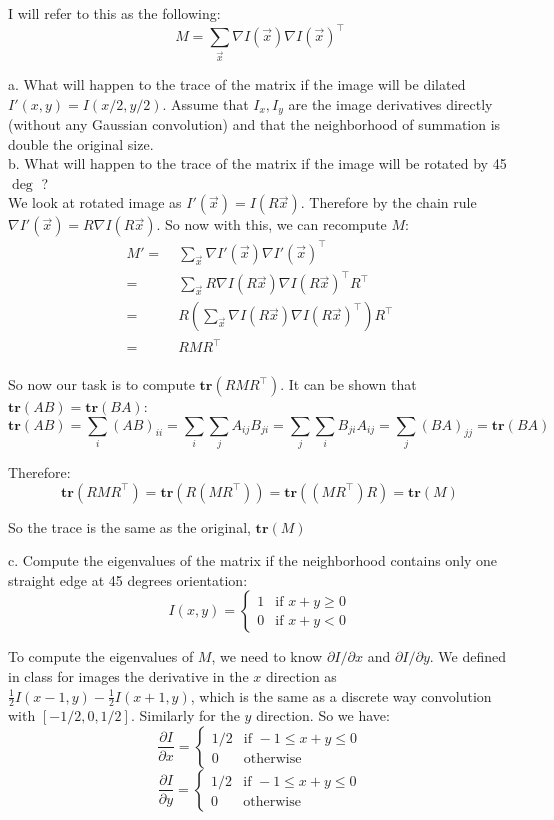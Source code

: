 \documentclass[11pt,english]{article}
\begin{document}
\begin{enumerate}
I will refer to this as the following:
\[
    M = \sum_{\vec{x}} \nabla I(\vec{x}) \nabla I(\vec{x})^\top 
\]

a. What will happen to the trace of the matrix if the image will be dilated $I'(x,y) = I(x/2,y/2)$.
Assume that $I_x,I_y$ are the image derivatives directly (without any Gaussian convolution) and that the neighborhood of summation is double the original size. 
\\
b. What will happen to the trace of the matrix if the image will be rotated by 45$\deg$ ?
\\
We look at rotated image as $I'(\vec{x}) = I(R\vec{x})$. Therefore by the chain rule
$\nabla I'(\vec{x}) = R \nabla I(R\vec{x})$. So now with this, we can recompute $M$:
\begin{align*}
    M'
    =&\; \sum_{\vec{x}} \nabla I'(\vec{x}) \nabla I'(\vec{x})^\top \\
    =&\; \sum_{\vec{x}} R\nabla I(R\vec{x}) \nabla I(R\vec{x})^\top R^\top \\ 
    =&\; R \left( \sum_{\vec{x}} \nabla I(R\vec{x}) \nabla I(R\vec{x})^\top \right) R^\top \\
    =&\; R M R^\top \\
\end{align*}

So now our task is to compute $\mathbf{tr}(R M R^\top)$. It can be shown that $\mathbf{tr}(AB) = \mathbf{tr}(BA)$:
\[ \mathbf{tr}(AB) = \sum_i (AB)_{ii} = \sum_i \sum_j A_{ij} B_{ji}
= \sum_j \sum_i B_{ji} A_{ij} = \sum_j (BA)_{jj} = \mathbf{tr}(BA)  \]

Therefore:
\[ \mathbf{tr}(RMR^\top) = \mathbf{tr}(R(MR^\top)) = \mathbf{tr}((MR^\top)R) = \mathbf{tr}(M) \]

So the trace is the same as the original, $\mathbf{tr}(M)$

c. Compute the eigenvalues of the matrix if the neighborhood contains only one straight edge at 45 degrees orientation:
\[
I(x,y) = \left\{
	\begin{array}{ll}
		1  & \mbox{if } x+y \geq 0 \\
		0 & \mbox{if } x+y < 0
	\end{array}
\right.
\]

To compute the eigenvalues of $M$, we need to know $\partial I / \partial x$ and $\partial I / \partial y$.
We defined in class for images the derivative in the $x$ direction as
$\frac{1}{2} I(x-1,y) - \frac{1}{2} I(x+1,y)$, which is the same as a discrete way convolution with
$[ -1/2, 0, 1/2]$. Similarly for the $y$ direction. So we have:
\[ \frac{\partial I}{\partial x} = \left\{
    \begin{array}{ll}
        1/2 & \textrm{if } -1 \le x + y \le 0 \\
        0 & \textrm{otherwise}
    \end{array} \right.
\]
\[ \frac{\partial I}{\partial y} = \left\{
    \begin{array}{ll}
        1/2 & \textrm{if } -1 \le x + y \le 0 \\
        0 & \textrm{otherwise}
    \end{array} \right.
\]


\end{enumerate}
\end{document}
